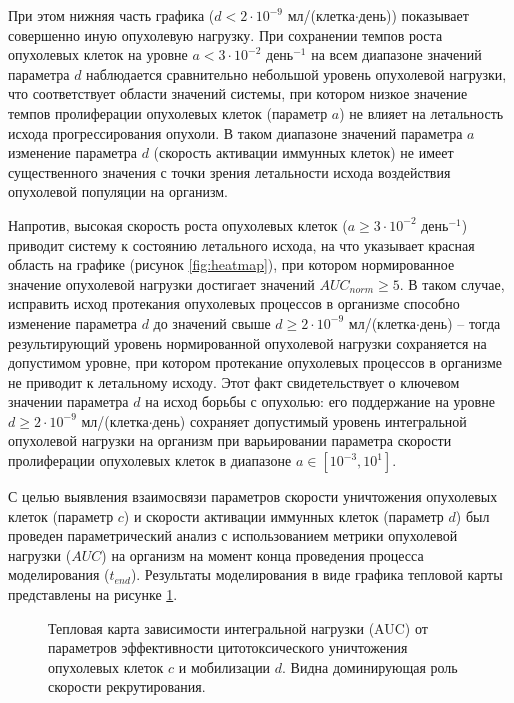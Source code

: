 При этом нижняя часть графика ($d < 2 \cdot 10^{-9}$ мл/(клетка$\cdot$день))
показывает совершенно
иную опухолевую нагрузку. При сохранении темпов роста опухолевых клеток на
уровне $a < 3 \cdot 10^{-2}$ день$^{-1}$ на всем диапазоне значений параметра
$d$ наблюдается сравнительно небольшой уровень опухолевой нагрузки, что соответствует
области значений системы, при котором низкое значение темпов пролиферации
опухолевых клеток (параметр $a$) не влияет на летальность исхода прогрессирования опухоли.
В таком диапазоне значений параметра $a$ изменение параметра $d$
(скорость активации иммунных клеток) не имеет существенного значения с точки
зрения летальности исхода воздействия опухолевой популяции на организм.

Напротив, высокая скорость роста опухолевых клеток ($a \ge 3 \cdot 10^{-2}$ день$^{-1}$)
приводит систему к состоянию летального исхода, на что указывает красная
область на графике (рисунок \ref{fig:heatmap}), при котором нормированное
значение опухолевой нагрузки достигает значений $AUC_{norm} \ge 5$. В таком
случае, исправить исход протекания опухолевых процессов в организме способно
изменение параметра $d$ до значений свыше $d \ge 2 \cdot 10^{-9}$
мл/(клетка$\cdot$день) -- тогда
результирующий уровень нормированной опухолевой нагрузки сохраняется на
допустимом уровне, при котором протекание опухолевых процессов в организме не
приводит к летальному исходу. Этот факт свидетельствует о ключевом значении
параметра $d$ на исход борьбы с опухолью: его поддержание на уровне $d \ge 2
\cdot 10^{-9}$ мл/(клетка$\cdot$день) сохраняет допустимый уровень интегральной
опухолевой нагрузки на организм при варьировании параметра скорости
пролиферации опухолевых клеток в диапазоне $a \in [10^{-3}, 10^1]$.

С целью выявления взаимосвязи параметров скорости уничтожения опухолевых клеток
(параметр $c$) и скорости активации иммунных клеток (параметр $d$) был проведен
параметрический анализ с использованием метрики опухолевой нагрузки ($AUC$) на
организм на момент конца проведения процесса моделирования ($t_{end}$).
Результаты моделирования в виде графика тепловой карты представлены на рисунке
\ref{fig:heatmap_cd}.

\begin{figure}[ht!]
  \centering
  
  \caption{Тепловая карта зависимости интегральной нагрузки (AUC) от параметров
    эффективности цитотоксического уничтожения опухолевых клеток $c$ и
  мобилизации $d$. Видна доминирующая роль скорости рекрутирования.}
  \label{fig:heatmap_cd}
\end{figure}

